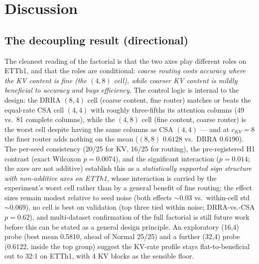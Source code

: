 \section{Discussion}
\label{sec:discussion}

\subsection{The decoupling result (directional)}
The cleanest reading of the factorial is that the two axes play different
roles on ETTh1, and that the roles are conditional: \emph{coarse routing costs
accuracy where the KV content is fine (the $(4,8)$ cell), while coarser KV
content is mildly beneficial to accuracy and buys efficiency}. The control logic is
internal to the design: the DRRA $(8,4)$ cell (coarse content, fine router) matches
or beats the equal-rate CSA cell $(4,4)$ with roughly three-fifths its attention
columns (49 vs.\ 81 complete columns), while the $(4,8)$ cell (fine content, coarse
router) is the worst cell despite having the same columns as CSA $(4,4)$ --- and
at $c_{KV}{=}8$ the finer router adds nothing on the mean ($(8,8)$ $0.6128$ vs.\
DRRA $0.6190$).
The per-seed consistency (20/25 for KV, 16/25 for routing), the
pre-registered H1 contrast (exact Wilcoxon $p = 0.0074$), and the significant
interaction ($p = 0.014$; the axes are not additive) establish this as a \emph{statistically
supported sign structure with non-additive axes on ETTh1}, whose interaction is carried by the
experiment's worst cell rather than by a general benefit of fine routing; the effect sizes remain
modest relative to seed noise (both effects ${\sim}0.03$ vs.\ within-cell std
${\sim}0.069$), no cell is best on validation (top three tied within noise; DRRA-vs.-CSA
$p = 0.62$), and multi-dataset confirmation of the
full factorial is still future work before this can be stated as a general design
principle. An exploratory (16,4) probe (best mean 0.5810, ahead of Normal 25/25) and a further (32,4) probe (0.6122, inside the top group) suggest the KV-rate profile stays flat-to-beneficial out to 32:1 on ETTh1, with 4 KV blocks as the sensible floor.


